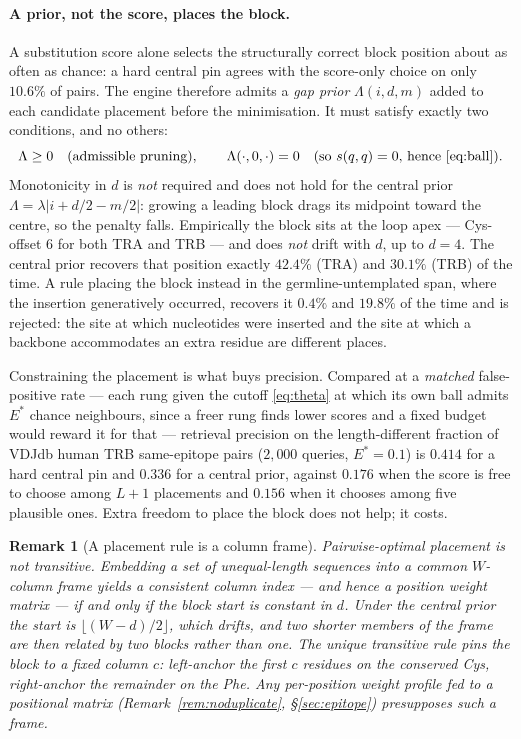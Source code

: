 \documentclass[11pt]{article}
\theoremstyle{oldplain}
\theoremstyle{oldrem}
\newtheorem{remark}{Remark}
\begin{document}
\paragraph{A prior, not the score, places the block.} A substitution score alone selects the
structurally correct block position about as often as chance: a hard central pin agrees with the
score-only choice on only $10.6\%$ of pairs. The engine therefore admits a \emph{gap prior}
$\Lambda(i,d,m)$ added to each candidate placement before the minimisation. It must satisfy exactly
two conditions, and no others:
\begin{equation}\label{eq:priorinv}
  \Lambda \ge 0 \quad\text{(admissible pruning)},
  \qquad
  \Lambda(\cdot,0,\cdot) = 0 \quad\text{(so } s(q,q)=0 \text{, hence \eqref{eq:ball})}.
\end{equation}
Monotonicity in $d$ is \emph{not} required and does not hold for the central prior
$\Lambda = \lambda\lvert i + d/2 - m/2\rvert$: growing a leading block drags its midpoint toward the
centre, so the penalty falls. Empirically the block sits at the loop apex --- Cys-offset $6$ for both
TRA and TRB --- and does \emph{not} drift with $d$, up to $d=4$. The central prior recovers that
position exactly $42.4\%$ (TRA) and $30.1\%$ (TRB) of the time. A rule placing the block instead in
the germline-untemplated span, where the insertion generatively occurred, recovers it $0.4\%$ and
$19.8\%$ of the time and is rejected: the site at which nucleotides were inserted and the site at
which a backbone accommodates an extra residue are different places.

Constraining the placement is what buys precision. Compared at a \emph{matched} false-positive rate
--- each rung given the cutoff \eqref{eq:theta} at which its own ball admits $E^\ast$ chance
neighbours, since a freer rung finds lower scores and a fixed budget would reward it for that ---
retrieval precision on the length-different fraction of VDJdb human TRB same-epitope pairs
($2{,}000$ queries, $E^\ast=0.1$) is $0.414$ for a hard central pin and $0.336$ for a central prior,
against $0.176$ when the score is free to choose among $L+1$ placements and $0.156$ when it chooses
among five plausible ones. Extra freedom to place the block does not help; it costs.

\begin{remark}[A placement rule is a column frame]\label{rem:frame}
Pairwise-optimal placement is not transitive. Embedding a set of unequal-length sequences into a
common $W$-column frame yields a consistent column index --- and hence a position weight matrix ---
if and only if the block start is constant in $d$. Under the central prior the start is
$\lfloor (W-d)/2 \rfloor$, which drifts, and two shorter members of the frame are then related by
\emph{two} blocks rather than one. The unique transitive rule pins the block to a fixed column $c$:
left-anchor the first $c$ residues on the conserved Cys, right-anchor the remainder on the Phe. Any
per-position weight profile fed to a positional matrix (Remark~\ref{rem:noduplicate},
\S\ref{sec:epitope}) presupposes such a frame.
\end{remark}
\end{document}
